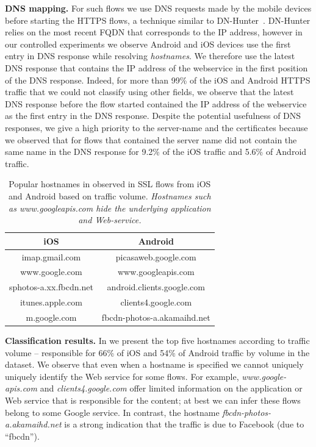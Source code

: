 \noindent\textbf{DNS mapping.} For such flows we use DNS requests made by the mobile devices before starting the HTTPS flows, a technique similar to DN-Hunter~\cite{bermudez:dnhunter}.
DN-Hunter relies on the most recent FQDN that corresponds to the IP address, however in our controlled experiments we observe Android and iOS devices use the first entry in DNS response while resolving \emph{hostnames}.
We therefore use the latest DNS response that contains the IP address of the webservice in the first position of the DNS response. 
Indeed, for more than 99\% of the iOS and Android HTTPS traffic that we could not classify using other fields, we observe that the latest DNS response before the flow started contained the IP address of the webservice as the first entry in the DNS response.
Despite the potential usefulness of DNS responses, we give a high priority to the server-name and the certificates because we observed that for flows that contained the server name did not contain the same name in the DNS response for 9.2\% of the iOS traffic and 5.6\% of Android traffic.

\begin{table}
\centering
\begin{small}
\begin{tabular}{|c|c|}
\hline
{\bf iOS} & {\bf Android} \tabularnewline
\hline
imap.gmail.com & picasaweb.google.com \tabularnewline
www.google.com & www.googleapis.com \tabularnewline
sphotos-a.xx.fbcdn.net & android.clients.google.com \tabularnewline
itunes.apple.com  & clients4.google.com \tabularnewline
m.google.com & fbcdn-photos-a.akamaihd.net \tabularnewline
\hline
\end{tabular}
\end{small}
\caption{Popular hostnames in observed in SSL flows from iOS and Android based on traffic volume. \emph{Hostnames such as www.googleapis.com hide the underlying application and Web-service.}}
\label{tab:sslclassify-popular-host}
\end{table}

\noindent\textbf{Classification results.} In  we present the top five hostnames according to traffic volume -- responsible for 66\% of iOS and 54\% of Android traffic by volume in the \mobWild dataset. 
We observe that even when a hostname is specified we cannot uniquely uniquely identify the Web service for some flows.
For example, \emph{www.google-apis.com} and \emph{clients4.google.com} offer limited information on the application or Web service that is responsible for the content; at best we can infer these flows belong to some Google service.
In contrast, the  hostname \emph{fbcdn-photos-a.akamaihd.net} is a strong indication that the traffic is due to Facebook (due to ``fbcdn'').

